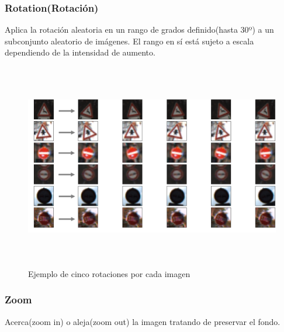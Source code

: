 	\subsubsection{Rotation(Rotación)}
		\vspace{-1.5em}
		Aplica la rotación aleatoria en un rango de grados definido(hasta 30º) a un subconjunto aleatorio de imágenes.
         El rango en sí está sujeto a escala dependiendo de la intensidad de aumento.
        \begin{figure}[H]
			\begin{center}
			\includegraphics[width=1\textwidth,height=9cm]{images/desarrollo/Augment/fixedrotation}
			\end{center}
			\begin{center}
			\caption{\small{Ejemplo de cinco rotaciones por cada imagen}}
			\vspace{-1em}
		{\small{\fontsize{10}{16.8}\selectfont {Fuente propia}}}
			\end{center}
			\vspace{-1.5em}
		\end{figure}
		\vspace{-2.5em}
    

    \subsubsection{Zoom}
    	\vspace{-1.5em}
    	Acerca(zoom in) o aleja(zoom out) la imagen  tratando de preservar el fondo.


